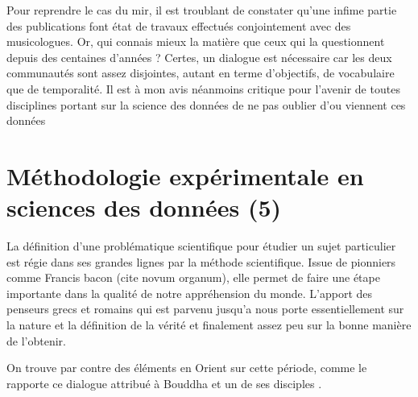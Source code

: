 Pour reprendre le cas du mir, il est troublant de constater qu'une infime partie des publications font état de travaux effectués conjointement avec des musicologues. Or, qui connais mieux la matière que ceux qui la questionnent depuis des centaines d'années ? Certes, un dialogue est nécessaire car les deux communautés sont assez disjointes, autant en terme d'objectifs, de vocabulaire que de temporalité. Il est à mon avis néanmoins critique pour l'avenir de toutes disciplines portant sur la science des données de ne pas oublier d'ou viennent ces données


\section{Méthodologie expérimentale en sciences des données (5)}

La définition d'une problématique scientifique pour étudier un sujet particulier est régie dans ses grandes lignes par la méthode scientifique. Issue de pionniers comme Francis bacon (cite novum organum), elle permet de faire une étape importante dans la qualité de notre appréhension du monde. L'apport des penseurs grecs et romains qui est parvenu jusqu'a nous porte essentiellement sur la nature et la définition de la vérité et finalement assez peu sur la bonne manière de l’obtenir.

On trouve par contre des éléments en Orient sur cette période, comme le rapporte ce dialogue attribué à Bouddha et un de ses disciples .

